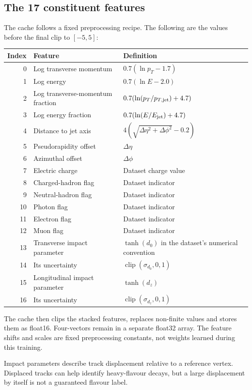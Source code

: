 \documentclass[11pt,a4paper]{article}
\numberwithin{equation}{section}
\begin{document}
\subsection{The 17 constituent features}
The cache follows a fixed preprocessing recipe. The following are the
values before the final clip to $[-5,5]$:
\begin{longtable}{rp{52mm}p{73mm}}
\toprule Index & Feature & Definition\\ \midrule
0 & Log transverse momentum & $0.7(\ln p_T-1.7)$\\
1 & Log energy & $0.7(\ln E-2.0)$\\
2 & Log transverse-momentum fraction & $0.7(\ln(p_T/p_{T,\rm jet})+4.7)$\\
3 & Log energy fraction & $0.7(\ln(E/E_{\rm jet})+4.7)$\\
4 & Distance to jet axis & $4(\sqrt{\Delta\eta^2+\Delta\phi^2}-0.2)$\\
5 & Pseudorapidity offset & $\Delta\eta$\\
6 & Azimuthal offset & $\Delta\phi$\\
7 & Electric charge & Dataset charge value\\
8 & Charged-hadron flag & Dataset indicator\\
9 & Neutral-hadron flag & Dataset indicator\\
10 & Photon flag & Dataset indicator\\
11 & Electron flag & Dataset indicator\\
12 & Muon flag & Dataset indicator\\
13 & Transverse impact parameter & $\tanh(d_0)$ in the dataset's numerical convention\\
14 & Its uncertainty & $\operatorname{clip}(\sigma_{d_0},0,1)$\\
15 & Longitudinal impact parameter & $\tanh(d_z)$\\
16 & Its uncertainty & $\operatorname{clip}(\sigma_{d_z},0,1)$\\
\bottomrule
\end{longtable}
The cache then clips the stacked features, replaces non-finite values and
stores them as float16. Four-vectors remain in a separate float32 array.
The feature shifts and scales are fixed preprocessing constants, not
weights learned during this training.

Impact parameters describe track displacement relative to a reference
vertex. Displaced tracks can help identify heavy-flavour decays, but a
large displacement by itself is not a guaranteed flavour label.
\end{document}
